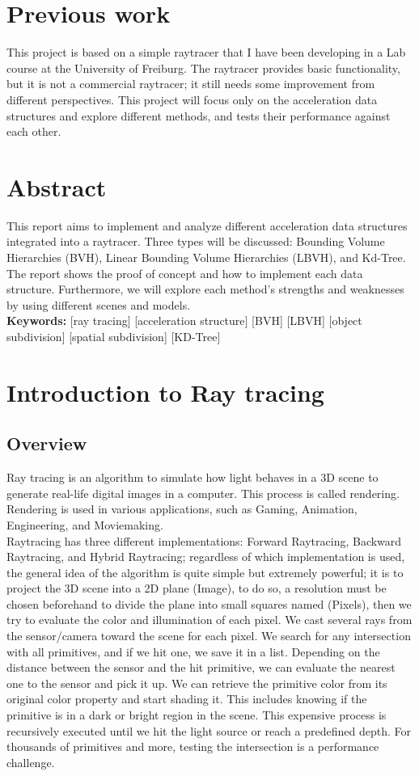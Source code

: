 \documentclass[11pt,a4paper]{article}
\begin{document}
\section*{Previous work}
This project is based on a simple raytracer that I have been developing in a Lab course at the University of Freiburg. The raytracer provides basic functionality, but it is not a commercial raytracer; it still needs some improvement from different perspectives. This project will focus only on the acceleration data structures and explore different methods, and tests their performance against each other.
\\
\section*{Abstract}
This report aims to implement and analyze different acceleration data structures integrated into a raytracer. Three types will be discussed: Bounding Volume Hierarchies (BVH), Linear Bounding Volume Hierarchies (LBVH), and Kd-Tree. The report shows the proof of concept and how to implement each data structure. Furthermore, we will explore each method's strengths and weaknesses by using different scenes and models. 
\\
\textbf{Keywords:} [ray tracing] [acceleration structure] [BVH] [LBVH] [object subdivision] [spatial
subdivision] [KD-Tree]
\clearpage
\tableofcontents
\clearpage



\section{Introduction to Ray tracing}
\subsection{Overview}
Ray tracing is an algorithm to simulate how light behaves in a 3D scene to generate real-life digital images in a computer. This process is called rendering. Rendering is used in various applications, such as Gaming, Animation, Engineering, and Moviemaking. 
\\
Raytracing has three different implementations: Forward Raytracing, Backward Raytracing, and Hybrid Raytracing; regardless of which implementation is used, the general idea of the algorithm is quite simple but extremely powerful; it is to project the 3D scene into a 2D plane (Image), to do so, a resolution must be chosen beforehand to divide the plane into small squares named (Pixels), then we try to evaluate the color and illumination of each pixel. We cast several rays from the sensor/camera toward the scene for each pixel. We search for any intersection with all primitives, and if we hit one, we save it in a list. Depending on the distance between the sensor and the hit primitive, we can evaluate the nearest one to the sensor and pick it up. We can retrieve the primitive color from its original color property and start shading it. This includes knowing if the primitive is in a dark or bright region in the scene. This expensive process is recursively executed until we hit the light source or reach a predefined depth. For thousands of primitives and more, testing the intersection is a performance challenge.
\end{document}
